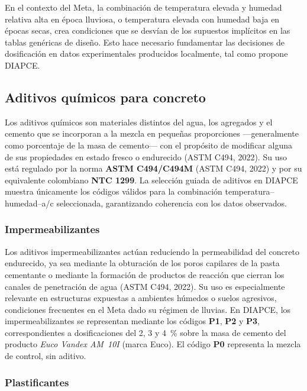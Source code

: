 En el contexto del Meta, la combinación de temperatura elevada y humedad relativa alta en época lluviosa, o temperatura elevada con humedad baja en épocas secas, crea condiciones que se desvían de los supuestos implícitos en las tablas genéricas de diseño. Esto hace necesario fundamentar las decisiones de dosificación en datos experimentales producidos localmente, tal como propone DIAPCE.

\subsection{Aditivos químicos para concreto}

Los aditivos químicos son materiales distintos del agua, los agregados y el cemento que se incorporan a la mezcla en pequeñas proporciones ---generalmente como porcentaje de la masa de cemento--- con el propósito de modificar alguna de sus propiedades en estado fresco o endurecido (ASTM C494, 2022). Su uso está regulado por la norma \textbf{ASTM C494/C494M} (ASTM C494, 2022) y por su equivalente colombiano \textbf{NTC 1299}. La selección guiada de aditivos en DIAPCE muestra únicamente los códigos válidos para la combinación temperatura–humedad–a/c seleccionada, garantizando coherencia con los datos observados.

\subsubsection*{Impermeabilizantes}

Los aditivos impermeabilizantes actúan reduciendo la permeabilidad del concreto endurecido, ya sea mediante la obturación de los poros capilares de la pasta cementante o mediante la formación de productos de reacción que cierran los canales de penetración de agua (ASTM C494, 2022). Su uso es especialmente relevante en estructuras expuestas a ambientes húmedos o suelos agresivos, condiciones frecuentes en el Meta dado su régimen de lluvias. En DIAPCE, los impermeabilizantes se representan mediante los códigos \textbf{P1}, \textbf{P2} y \textbf{P3}, correspondientes a dosificaciones del 2, 3 y 4~\% sobre la masa de cemento del producto \textit{Euco Vandex AM~10I} (marca Euco). El código \textbf{P0} representa la mezcla de control, sin aditivo.

\subsubsection*{Plastificantes}

